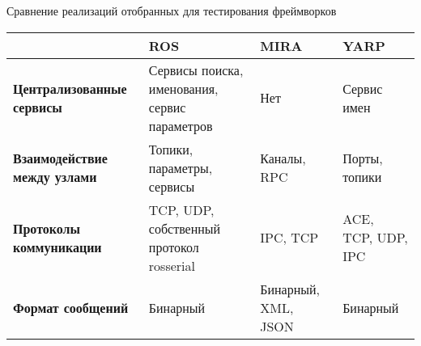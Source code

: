 \begin{frame}{Сравнение реализаций отобранных для тестирования фреймворков}
	\begin{table}[!h]
		\centering
		\footnotesize
		\def\arraystretch{1.3}
		\begin{tabular}{|p{2.7cm}|p{2cm}|p{2cm}|p{2cm}|}
			\hline
			& \textbf{ROS} & \textbf{MIRA} & \textbf{YARP} \\ \hline
			\textbf{Централизованные сервисы} & Сервисы поиска, именования, сервис параметров & Нет & Сервис имен \\ \hline
			\textbf{Взаимодействие между узлами} & Топики, параметры, сервисы & Каналы, RPC  & Порты, топики \\ \hline
			\textbf{Протоколы коммуникации} & TCP, UDP, собственный протокол rosserial & IPC, TCP & ACE, TCP, UDP, IPC \\ \hline
			\textbf{Формат сообщений} & Бинарный & Бинарный, XML, JSON  & Бинарный \\ \hline
		\end{tabular}
	\end{table}
\end{frame}



